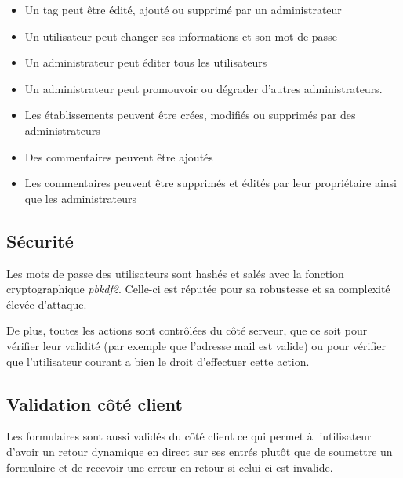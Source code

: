 \documentclass[10pt,a4paper]{article}
\begin{document}
\begin{itemize}
    \item Un tag peut être édité, ajouté ou supprimé par un administrateur
    \item Un utilisateur peut changer ses informations et son mot de passe
    \item Un administrateur peut éditer tous les utilisateurs
    \item Un administrateur peut promouvoir ou dégrader d'autres administrateurs.
    \item Les établissements peuvent être crées, modifiés ou supprimés par des administrateurs
    \item Des commentaires peuvent être ajoutés
    \item Les commentaires peuvent être supprimés et édités par leur propriétaire ainsi que les administrateurs
\end{itemize}

\subsection{Sécurité}

Les mots de passe des utilisateurs sont hashés et salés avec la fonction cryptographique \textit{pbkdf2}. Celle-ci est réputée pour sa robustesse et sa complexité élevée d'attaque.

De plus, toutes les actions sont contrôlées du côté serveur, que ce soit pour vérifier leur validité (par exemple que l'adresse mail est valide) ou pour vérifier que l'utilisateur courant a bien le droit d'effectuer cette action.

\subsection{Validation côté client}

Les formulaires sont aussi validés du côté client ce qui permet à l'utilisateur d'avoir un retour dynamique en direct sur ses entrés plutôt que de soumettre un formulaire et de recevoir une erreur en retour si celui-ci est invalide.
\end{document}
